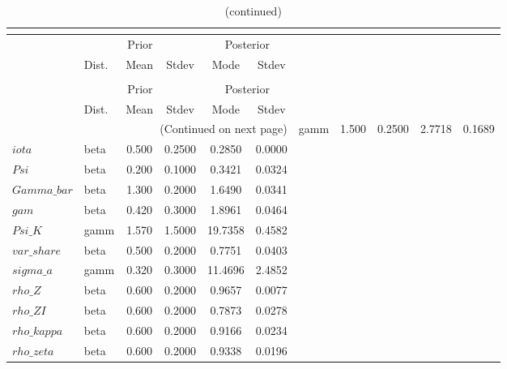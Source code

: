  
\begin{center}
\begin{longtable}{llcccc} 
\caption{Results from posterior maximization (parameters)}\\
 \label{Table:Posterior:1}\\
\toprule 
  & \multicolumn{3}{c}{Prior}  &  \multicolumn{2}{c}{Posterior} \\
  \cmidrule(r{.75em}){2-4} \cmidrule(r{.75em}){5-6}
  & Dist. & Mean  & Stdev & Mode & Stdev \\ 
\midrule \endfirsthead 
\caption{(continued)}\\
 \bottomrule 
  & \multicolumn{3}{c}{Prior}  &  \multicolumn{2}{c}{Posterior} \\
  \cmidrule(r{.75em}){2-4} \cmidrule(r{.75em}){5-6}
  & Dist. & Mean  & Stdev & Mode & Stdev \\ 
\midrule \endhead 
\bottomrule \multicolumn{6}{r}{(Continued on next page)}\endfoot 
\bottomrule\endlastfoot 
$sigma$ & gamm &   1.500 & 0.2500 &   2.7718 &  0.1689 \\ 
$iota$ & beta &   0.500 & 0.2500 &   0.2850 &  0.0000 \\ 
$Psi$ & beta &   0.200 & 0.1000 &   0.3421 &  0.0324 \\ 
$Gamma\_bar$ & beta &   1.300 & 0.2000 &   1.6490 &  0.0341 \\ 
$gam$ & beta &   0.420 & 0.3000 &   1.8961 &  0.0464 \\ 
$Psi\_K$ & gamm &   1.570 & 1.5000 &  19.7358 &  0.4582 \\ 
$var\_share$ & beta &   0.500 & 0.2000 &   0.7751 &  0.0403 \\ 
$sigma\_a$ & gamm &   0.320 & 0.3000 &  11.4696 &  2.4852 \\ 
$rho\_Z$ & beta &   0.600 & 0.2000 &   0.9657 &  0.0077 \\ 
$rho\_ZI$ & beta &   0.600 & 0.2000 &   0.7873 &  0.0278 \\ 
$rho\_kappa$ & beta &   0.600 & 0.2000 &   0.9166 &  0.0234 \\ 
$rho\_zeta$ & beta &   0.600 & 0.2000 &   0.9338 &  0.0196 \\ 
\end{longtable}
 \end{center}
